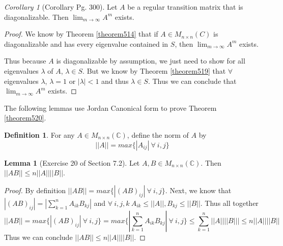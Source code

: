 \documentclass{amsart}
\theoremstyle{definition}
\newtheorem{definition}[thm]{Definition}
\newtheorem{lemma}[theorem]{Lemma}
\theoremstyle{remark}
\newtheorem{corollary}{Corollary}[theorem]
\numberwithin{equation}{section}
\begin{document}
\begin{corollary}[Corollary Pg. 300]\label{cor519}
Let $A$ be a regular transition matrix that is diagonalizable.
Then $\lim_{m \to \infty} A^m$ exists.

\end{corollary}

\begin{proof}

We know by Theorem \ref{theorem514} that if $A \in M_{n \times n}(C)$ is diagonalizable and has every eigenvalue contained in $S$, then $\lim_{m \to \infty} A^m$ exists.


Thus because $A$ is diagonalizable by assumption, we just need to show for all eigenvalues $\lambda$ of $A$, $\lambda \in S$.
But we know by Theorem \ref{theorem519} that $\forall$ eigenvalues $\lambda$, $\lambda = 1$ or $|\lambda| < 1$ and thus $\lambda \in S$.
Thus we can conclude that $\lim_{m \to \infty} A^m$ exists.

\end{proof}



The following lemmas use Jordan Canonical form to prove Theorem \ref{theorem520}.

\begin{definition}
For any $A \in M_{n \times n}(\mathbb{C})$, define the norm of $A$ by
$$||A|| = max \{|A_{ij}|\ \forall\ i, j \}$$

\end{definition}

\begin{lemma}[Exercise 20 of Section 7.2]\label{exercise7220}
Let $A, B \in M_{n \times n}(\mathbb{C})$.
Then $||AB|| \leq n ||A|| ||B||$.

\end{lemma}


\begin{proof}
	By definition $||AB|| = max \{|(AB)_{ij}|\ \forall\ i, j \}$.
	Next, we know that $|(AB)_{ij}|  = |\sum_{k = 1}^nA_{ik}B_{kj}|$ and 
	$\forall\ i, j, k\ A_{ik} \leq ||A||,  B_{kj} \leq ||B||$.
	Thus all together 
	$$ ||AB|| = max \{|(AB)_{ij}|\ \forall\ i, j \} = max \{|\sum_{k = 1}^nA_{ik}B_{kj}|\ \forall\ i, j \} \leq \sum_{k = 1}^n||A||||B||| \leq n||A||||B||$$
	Thus we can conclude $||AB|| \leq n||A||||B||$.

\end{proof}
\end{document}
